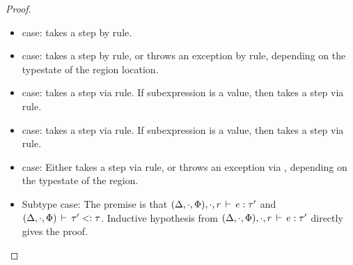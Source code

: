 \begin{proof}
\begin{itemize}
  \item {} case: takes a step by 
  rule.

  \item {} case: takes a step by  rule, or throws an
  exception by  rule, depending on the typestate
  of the region location.

  \item {} case: takes a step via  rule.  If
  subexpression is a value, then  takes a step via
   rule.

  \item {} case: takes a step via  rule.  If
  subexpression is a value, then  takes a step via
   rule.

  \item {} case: Either takes a step via 
  rule, or throws an exception via , depending
  on the typestate of the region.

  \item Subtype case: The premise is that
  $(\Delta,\cdot,\Phi),\cdot,r\,\vdash\,e:\tau'$ and 
  $(\Delta,\cdot,\Phi)\,\vdash\,\tau' <: \tau$. Inductive hypothesis
  from $(\Delta,\cdot,\Phi),\cdot,r\,\vdash\,e:\tau'$ directly
  gives the proof.

\end{itemize}
\end{proof}

